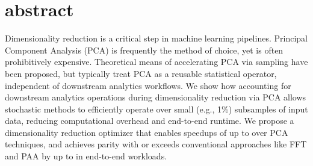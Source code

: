 \section*{abstract}
Dimensionality reduction is a critical step in machine learning pipelines. 
Principal Component Analysis (PCA) is frequently the method of choice, yet is often prohibitively expensive.
Theoretical means of accelerating PCA via sampling have been proposed, but typically treat PCA as a reusable statistical operator, independent of downstream analytics workflows.
We show how accounting for downstream analytics operations during dimensionality reduction via PCA allows stochastic methods to efficiently operate over small (e.g., 1\%) subsamples of input data, reducing computational overhead and end-to-end runtime. 
We propose a dimensionality reduction optimizer that enables speedups of up to \red{$5\times$} over  PCA techniques, and achieves parity with or exceeds conventional approaches like FFT and PAA by up to \red{$16\times$} in end-to-end workloads.







